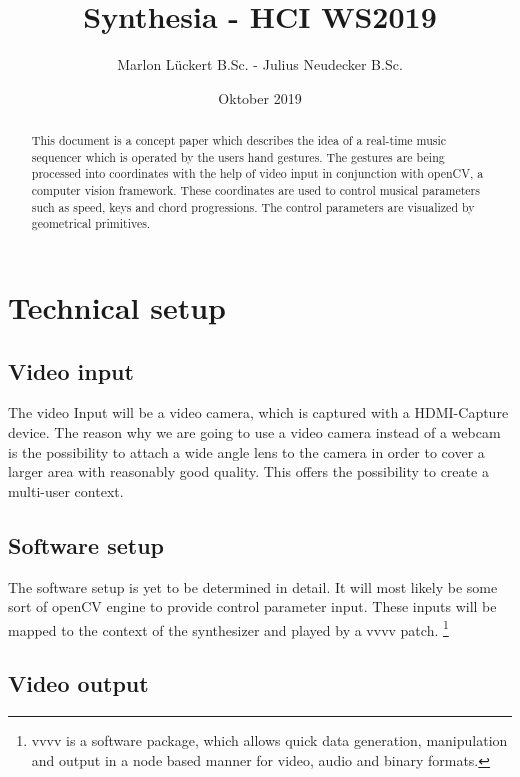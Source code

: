 \documentclass[titlepage, a4paper, 11pt]{scrartcl}
\begin{document}
\title{Synthesia - HCI WS2019}
\author{Marlon Lückert B.Sc. - Julius Neudecker B.Sc.}
\date{Oktober 2019}
\maketitle

\begin{abstract}
This document is a concept paper which describes the idea of a real-time music sequencer which is operated by the users hand gestures. 
The gestures are being processed into coordinates with the help of video input in conjunction with openCV, a computer vision framework. 
These coordinates are used to control musical parameters such as speed, keys and chord progressions. The control parameters are visualized by geometrical primitives.
\end{abstract}

\tableofcontents

\pagebreak


\section{Technical setup}

\subsection{Video input} \label{videoinput}

The video Input will be a video camera, which is captured with a HDMI-Capture device. The reason why we are going to use a video camera instead of a webcam is the possibility
to attach a wide angle lens to the camera in order to cover a larger area with reasonably good quality. This offers the possibility to create a multi-user context.
    

\subsection{Software setup}

The software setup is yet to be determined in detail. It will most likely be some sort of openCV engine to provide 
control parameter input. These inputs will be mapped to the context of the synthesizer and played by a vvvv patch.
\footnote{vvvv is a software package, which allows quick data generation, manipulation and output in a node based manner for video, audio and binary formats.}

\subsection{Video output}
\end{document}
